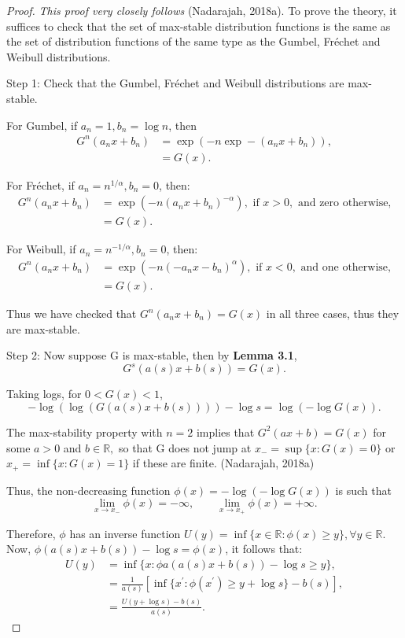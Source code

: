 \documentclass{article}
\begin{document}
\begin{proof}
\textit{This proof very closely follows} (Nadarajah, 2018a). To prove the theory, it suffices to check that the set of max-stable distribution functions is the same as the set of distribution functions of the same type as the Gumbel, Fr\'echet and Weibull distributions.

Step 1: Check that the Gumbel, Fr\'echet and Weibull distributions are max-stable.

For Gumbel, if $a_n=1, b_n=\log{n}$, then
\begin{align*}
    G^{n}(a_nx+b_n) &= \exp(-n\exp-(a_nx+b_n)),\\
                    &= G(x).
\end{align*}

For Fr\'echet, if $a_n = n^{1/\alpha}, b_n = 0$, then:
\begin{align*}
    G^{n}(a_nx+b_n) &= \exp(-n(a_nx+b_n)^{-\alpha}), \text{ if } x > 0, \text{ and zero otherwise,}\\
                    &= G(x).
\end{align*}

For Weibull, if $a_n =n^{-1/\alpha},b_n=0$, then:
\begin{align*}
    G^{n}(a_nx+b_n) &= \exp(-n(-a_nx-b_n)^{\alpha}), \text{ if } x < 0, \text{ and one otherwise,}\\
                    &= G(x).
\end{align*}

Thus we have checked that $G^{n}(a_n x+ b_n) = G(x)$ in all three cases, thus they are max-stable.

Step 2: Now suppose G is max-stable, then by \textbf{Lemma 3.1},
$$G^s(a(s)x+b(s))=G(x).$$

Taking logs, for $0<G(x)<1$,
$$-\log(\log(G(a(s)x+b(s))))-\log s = \log(-\log G(x)).$$

The max-stability property with $n = 2$ implies that $G^2(ax+b) = G(x)$ for some $a>0$ and $b\in\mathbb{R},$ so that G does not jump at $x_{-}=\sup\{x:G(x)=0\}$ or $x_{+} = \inf\{x:G(x)=1\}$ if these are finite. (Nadarajah, 2018a)

Thus, the non-decreasing function $\phi(x)=-\log(-\log G(x))$ is such that
$$ \lim_{x \to x_-} \phi(x) = -\infty,\qquad \lim_{x \to x_+} \phi(x) = +\infty. $$

Therefore, $\phi$ has an inverse function $U(y)=\inf\{x\in\mathbb{R}:\phi(x)\geq y\}, \forall y\in\mathbb{R}.$ Now, $\phi(a(s)x+b(s))-\log s = \phi(x)$, it follows that:
\begin{align*}
    U(y) &= \inf\{x:\phi a(a(s)x+b(s))-\log s \geq y\},\\
         &= \frac{1}{a(s)}[\inf\{x^{\prime}:\phi(x^{\prime})\geq y + \log s\} - b(s)],\\
         &= \frac{U(y+\log s) -b(s)}{a(s)}.
\end{align*}


\end{proof}
\end{document}
